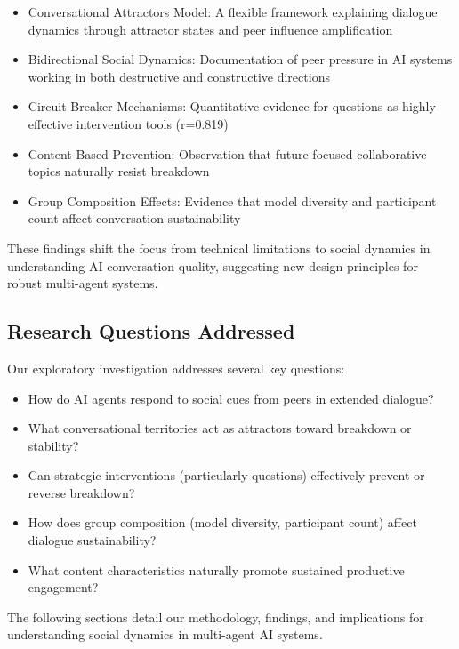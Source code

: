 \documentclass[11pt,letterpaper]{article}
\newcommand{\exponedataQuestionCorrelation}{0.819}
\begin{document}
\begin{itemize}
    \item Conversational Attractors Model: A flexible framework explaining dialogue dynamics through attractor states and peer influence amplification
    \item Bidirectional Social Dynamics: Documentation of peer pressure in AI systems working in both destructive and constructive directions
    \item Circuit Breaker Mechanisms: Quantitative evidence for questions as highly effective intervention tools (r=\exponedataQuestionCorrelation{})
    \item Content-Based Prevention: Observation that future-focused collaborative topics naturally resist breakdown
    \item Group Composition Effects: Evidence that model diversity and participant count affect conversation sustainability
\end{itemize}

These findings shift the focus from technical limitations to social dynamics in understanding AI conversation quality, suggesting new design principles for robust multi-agent systems.

\subsection{Research Questions Addressed}

Our exploratory investigation addresses several key questions:

\begin{itemize}
    \item How do AI agents respond to social cues from peers in extended dialogue?
    \item What conversational territories act as attractors toward breakdown or stability?
    \item Can strategic interventions (particularly questions) effectively prevent or reverse breakdown?
    \item How does group composition (model diversity, participant count) affect dialogue sustainability?
    \item What content characteristics naturally promote sustained productive engagement?
\end{itemize}

The following sections detail our methodology, findings, and implications for understanding social dynamics in multi-agent AI systems.
\end{document}

